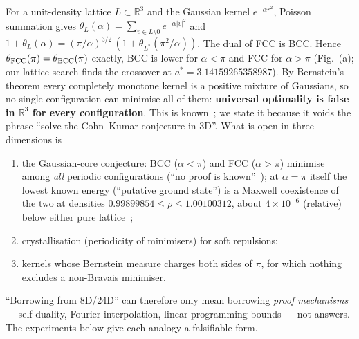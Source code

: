 \documentclass[11pt,a4paper]{article}
\begin{document}
For a unit-density lattice $L\subset\mathbb R^3$ and the Gaussian kernel $e^{-\alpha r^2}$, Poisson summation gives
$\theta_L(\alpha)=\sum_{v\in L\setminus0}e^{-\alpha|v|^2}$ and $1+\theta_L(\alpha)=(\pi/\alpha)^{3/2}\,(1+\theta_{L^*}(\pi^2/\alpha))$.
The dual of FCC is BCC. Hence $\theta_{\rm FCC}(\pi)=\theta_{\rm BCC}(\pi)$ exactly, BCC is lower for $\alpha<\pi$ and FCC for
$\alpha>\pi$ (Fig.~(a); our lattice search finds the crossover at $a^*=3.14159265358987$). By Bernstein's theorem every completely
monotone kernel is a positive mixture of Gaussians, so no single configuration can minimise all of them: \textbf{universal
optimality is false in $\mathbb R^3$ for every configuration}. This is known~\cite{CK07,CKS09}; we state it because it voids the
phrase ``solve the Cohn--Kumar conjecture in 3D''. What is open in three dimensions is
\begin{enumerate}[leftmargin=1.6em,itemsep=1pt]
\item[Q1] the Gaussian-core conjecture: BCC ($\alpha<\pi$) and FCC ($\alpha>\pi$) minimise among \emph{all} periodic configurations
(``no proof is known''~\cite{CKS09}); at $\alpha=\pi$ itself the lowest known energy (``putative ground state'') is a Maxwell coexistence of the two at densities
$0.99899854\le\rho\le1.00100312$, about $4\times10^{-6}$ (relative) below either pure lattice~\cite{CKS09};
\item[Q2] crystallisation (periodicity of minimisers) for soft repulsions;
\item[Q3] kernels whose Bernstein measure charges both sides of $\pi$, for which nothing excludes a non-Bravais minimiser.
\end{enumerate}
``Borrowing from 8D/24D'' can therefore only mean borrowing \emph{proof mechanisms} --- self-duality, Fourier interpolation,
linear-programming bounds --- not answers. The experiments below give each analogy a falsifiable form.
\end{document}
